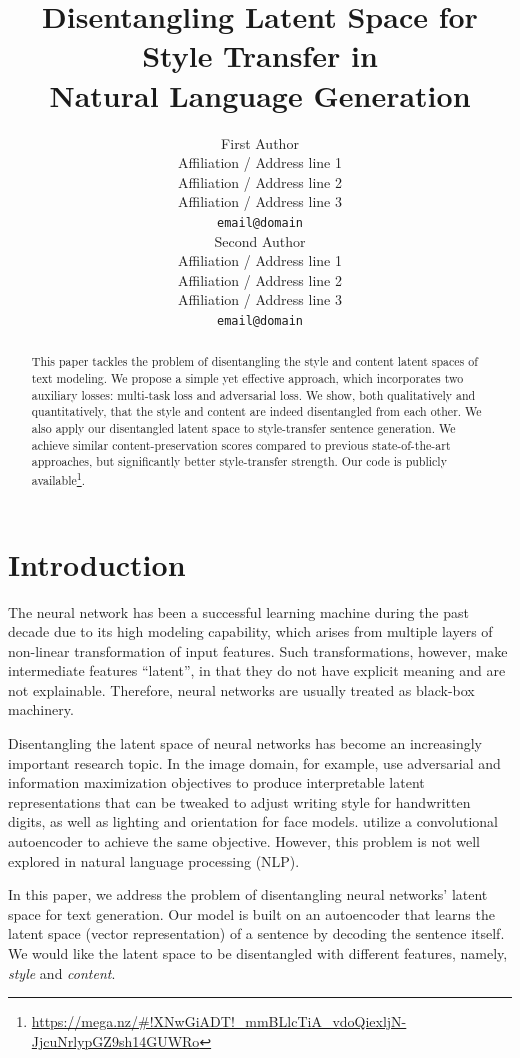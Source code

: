 \documentclass[11pt,a4paper]{article}
\title{Disentangling Latent Space for Style Transfer in\\Natural Language Generation}
\author{First Author \\
  Affiliation / Address line 1 \\
  Affiliation / Address line 2 \\
  Affiliation / Address line 3 \\
  {\tt email@domain} \\\And
  Second Author \\
  Affiliation / Address line 1 \\
  Affiliation / Address line 2 \\
  Affiliation / Address line 3 \\
  {\tt email@domain} \\}
\date{}
\begin{document}
\maketitle

\graphicspath{{images/}}


\begin{abstract}
	This paper tackles the problem of disentangling the style and content latent spaces of text modeling. We propose a simple yet effective approach, which incorporates two auxiliary losses: multi-task loss and adversarial loss. We show, both qualitatively and quantitatively, that the style and content are indeed disentangled from each other. We also apply our disentangled latent space to style-transfer sentence generation. We achieve similar content-preservation scores compared to previous state-of-the-art approaches, but significantly better style-transfer strength. Our code is publicly available\footnote{\tiny{\url{https://mega.nz/\#!XNwGiADT!_mmBLlcTiA_vdoQiexljN-JjcuNrlypGZ9sh14GUWRo}}}.
\end{abstract}

% 

\section{Introduction}

The neural network has been a successful learning machine during the past decade due to its high modeling capability, which arises from multiple layers of non-linear transformation of input features. Such transformations, however, make intermediate features ``latent'', in that they do not have explicit meaning and are not explainable. Therefore, neural networks are usually treated as black-box machinery.

Disentangling the latent space of neural networks has become an increasingly important research topic. In the image domain, for example,  use adversarial and information maximization objectives to produce interpretable latent representations that can be tweaked to adjust writing style for handwritten digits, as well as lighting and orientation for face models.  utilize a convolutional autoencoder to achieve the same objective. However, this problem is not well explored in natural language processing (NLP).

In this paper, we address the problem of disentangling neural networks' latent space for text generation. Our model is built on an autoencoder that learns the latent space (vector representation) of a sentence by decoding the sentence itself. We would like the latent space to be disentangled with different features, namely, \textit{style} and \textit{content}.
\end{document}
